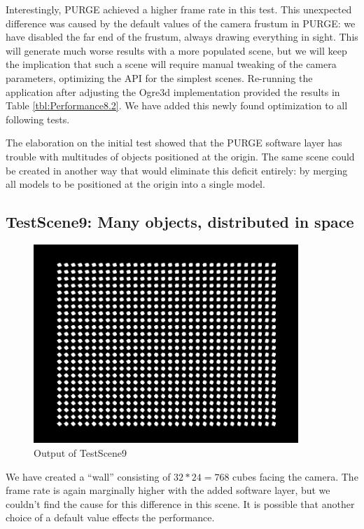 		Interestingly, PURGE achieved a higher frame rate in this test. This unexpected difference was caused by the default values of the camera frustum in PURGE: we have disabled the far end of the frustum, always drawing everything in sight. This will generate much worse results with a more populated scene, but we will keep the implication that such a scene will require manual tweaking of the camera parameters, optimizing the API for the simplest scenes. Re-running the application after adjusting the Ogre3d implementation provided the results in Table \ref{tbl:Performance8.2}. We have added this newly found optimization to all following tests.

		The elaboration on the initial test showed that the PURGE software layer has trouble with multitudes of objects positioned at the origin. The same scene could be created in another way that would eliminate this deficit entirely: by merging all models to be positioned at the origin into a single model.

	\subsection{TestScene9: Many objects, distributed in space}

		\begin{figure}[htbp]
			\centering
			\includegraphics[width=10cm]{images/TestScene9.png}
			\caption{Output of TestScene9}
			\label{fig:TestScene9}
		\end{figure}

		We have created a ``wall'' consisting of $32 * 24 = 768$ cubes facing the camera. The frame rate is again marginally higher with the added software layer, but we couldn't find the cause for this difference in this scene. It is possible that another choice of a default value effects the performance.

